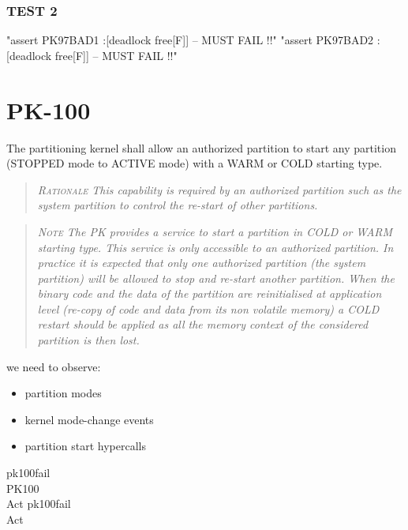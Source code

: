 \subsubsection{TEST 2}
\begin{assert}
"assert PK97BAD1 :[deadlock free[F]]  -- MUST FAIL !!"
\also "assert PK97BAD2 :[deadlock free[F]]  -- MUST FAIL !!"
\end{assert}


\section{PK-100}

The partitioning kernel shall allow an authorized partition
to start any partition (STOPPED mode to ACTIVE mode)
with a WARM or COLD starting type.
\begin{quote}\it
\textsc{Rationale}
 This capability is required by an authorized partition
 such as the system partition to control the re-start of other partitions.
\end{quote}
\begin{quote}\it
\textsc{Note}
The PK provides a service to start a partition in COLD or WARM starting type.
This service is only accessible to an authorized partition.
In practice it is expected that only one authorized partition
(the system partition) will be allowed to stop and re-start another partition.
When the binary code and the data of the partition are reinitialised
at application level (re-copy of code and data from its non volatile memory)
a COLD restart should be applied
as all the memory context of the considered partition is then lost.
\end{quote}


 we need to observe:
 \begin{itemize}
 \item partition modes
 \item kernel mode-change events
 \item partition start hypercalls
\end{itemize}
\begin{circus}
\circchannel pk100fail\\

\circprocess PK100 \circdef \circbegin\\
  Act \circdef pk100fail \then \Stop\\ %
  \circspot Act\\
\circend
\end{circus}

